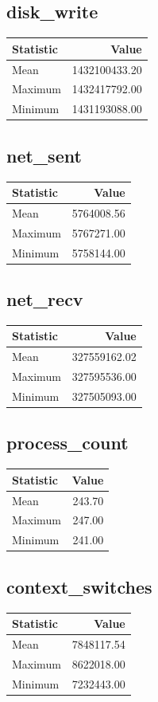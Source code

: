 \documentclass[11pt]{article}
\begin{document}
\subsection{disk_write}
\begin{tabular}{lr}
\toprule
Statistic & Value \\
\midrule
Mean & 1432100433.20 \\
Maximum & 1432417792.00 \\
Minimum & 1431193088.00 \\
\bottomrule
\end{tabular}


\subsection{net_sent}
\begin{tabular}{lr}
\toprule
Statistic & Value \\
\midrule
Mean & 5764008.56 \\
Maximum & 5767271.00 \\
Minimum & 5758144.00 \\
\bottomrule
\end{tabular}


\subsection{net_recv}
\begin{tabular}{lr}
\toprule
Statistic & Value \\
\midrule
Mean & 327559162.02 \\
Maximum & 327595536.00 \\
Minimum & 327505093.00 \\
\bottomrule
\end{tabular}


\subsection{process_count}
\begin{tabular}{lr}
\toprule
Statistic & Value \\
\midrule
Mean & 243.70 \\
Maximum & 247.00 \\
Minimum & 241.00 \\
\bottomrule
\end{tabular}


\subsection{context_switches}
\begin{tabular}{lr}
\toprule
Statistic & Value \\
\midrule
Mean & 7848117.54 \\
Maximum & 8622018.00 \\
Minimum & 7232443.00 \\
\bottomrule
\end{tabular}
\end{document}
